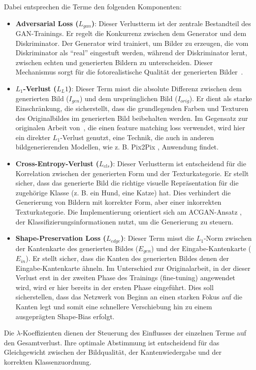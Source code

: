 Dabei entsprechen die Terme den folgenden Komponenten:
\begin{itemize}
\item \textbf{Adversarial Loss ($L_{gan}$)}: Dieser Verlustterm ist der zentrale Bestandteil des \ac{GAN}-Trainings. Er regelt die Konkurrenz zwischen dem Generator und dem Diskriminator. Der Generator wird trainiert, um Bilder zu erzeugen, die vom Diskriminator als \enquote{real} eingestuft werden, während der Diskriminator lernt, zwischen echten und generierten Bildern zu unterscheiden. Dieser Mechanismus sorgt für die fotorealistische Qualität der generierten Bilder~\cite{He_2023_ICCV}.
\item \textbf{$L_1$-Verlust ($L_L1$)}: Dieser Term misst die absolute Differenz zwischen dem generierten Bild ($I_{gen}$) und dem ursprünglichen Bild ($I_{orig}$). Er dient als starke Einschränkung, die sicherstellt, dass die grundlegenden Farben und Texturen des Originalbildes im generierten Bild beibehalten werden. Im Gegensatz zur originalen Arbeit von~\textcite{He_2023_ICCV}, die einen feature matching loss verwendet, wird hier ein direkter $L_1$-Verlust genutzt, eine Technik, die auch in anderen bildgenerierenden Modellen, wie z. B. Pix2Pix \cite{isola2018Pix2Pix}, Anwendung findet.
\item \textbf{Cross-Entropy-Verlust ($L_{cls}$)}: Dieser Verlustterm ist entscheidend für die Korrelation zwischen der generierten Form und der Texturkategorie. Er stellt sicher, dass das generierte Bild die richtige visuelle Repräsentation für die zugehörige Klasse (z. B. ein Hund, eine Katze) hat. Dies verhindert die Generierung von Bildern mit korrekter Form, aber einer inkorrekten Texturkategorie. Die Implementierung orientiert sich am ACGAN-Ansatz \cite{odena2017ACGAN}, der Klassifizierungsinformationen nutzt, um die Generierung zu steuern.
\item \textbf{Shape-Preservation Loss ($L_{edge}$)}: Dieser Term misst die $L_1$-Norm zwischen der Kantenkarte des generierten Bildes ($E_{gen}$) und der Eingabe-Kantenkarte ($E_{in}$). Er stellt sicher, dass die Kanten des generierten Bildes denen der Eingabe-Kantenkarte ähneln. Im Unterschied zur Originalarbeit, in der dieser Verlust erst in der zweiten Phase des Trainings (fine-tuning) angewendet wird, wird er hier bereits in der ersten Phase eingeführt. Dies soll sicherstellen, dass das Netzwerk von Beginn an einen starken Fokus auf die Kanten legt und somit eine schnellere Verschiebung hin zu einem ausgeprägten Shape-Bias erfolgt.
\end{itemize}
Die $\lambda$-Koeffizienten dienen der Steuerung des Einflusses der einzelnen Terme auf den Gesamtverlust. Ihre optimale Abstimmung ist entscheidend für das Gleichgewicht zwischen der Bildqualität, der Kantenwiedergabe und der korrekten Klassenzuordnung.


